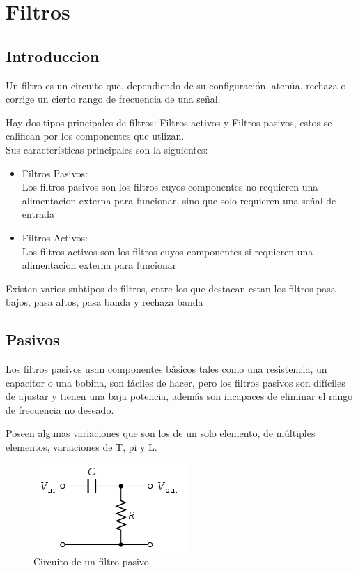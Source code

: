 \documentclass[../main.tex]{subfiles}
\begin{document}
\graphicspath{{../imagenes/}}
\section{Filtros}

	\subsection{Introduccion}	
	Un filtro es un circuito que, dependiendo de su configuración, atenúa, rechaza o corrige
	un cierto rango de frecuencia de una señal.

	Hay dos tipos principales de filtros: Filtros activos y Filtros pasivos, estos
	se califican por los componentes que utlizan.\\
	Sus características principales son la siguientes:
	\begin{itemize}
		\item Filtros Pasivos:\\ Los filtros pasivos son los filtros cuyos componentes no
			requieren una alimentacion externa para funcionar, sino que solo requieren una 
			señal de entrada
		\item Filtros Activos:\\ Los filtros activos son los filtros cuyos componentes si
			requieren una alimentacion externa para funcionar
	\end{itemize}

	Existen varios subtipos de filtros, entre los que destacan estan los filtros 
	pasa bajos, pasa altos, pasa banda y rechaza banda \\ 


	\subsection{Pasivos}
	Los filtros pasivos usan componentes básicos tales como 
	una resistencia, un capacitor o una bobina, son fáciles de
	hacer, pero los filtros pasivos son difíciles de ajustar
	y tienen una baja potencia, además son incapaces de 
	eliminar el rango de frecuencia no deseado.
	
	Poseen algunas variaciones que son los de un solo elemento,
	de múltiples elementos, variaciones de T, pi y L.
	\begin{figure}[H]
		\includegraphics[width=0.6 \textwidth]{filtros/filtro_pasivo.png}
		\centering
		\caption{Circuito de un filtro pasivo}
	\end{figure}
\end{document}
